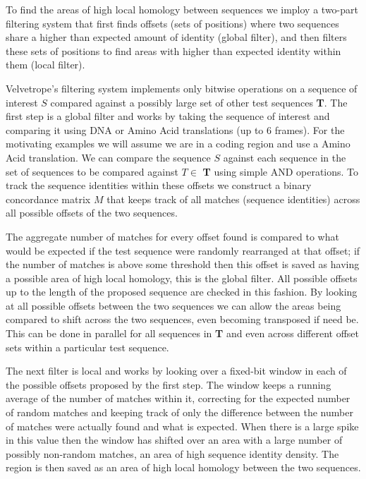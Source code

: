 \documentclass[phd,tocprelim]{cornell}
\begin{document}
To find the areas of high local homology between sequences we imploy a two-part filtering system that first finds offsets (sets of positions) where two sequences share a higher than expected amount of identity (global filter), and then filters these sets of positions to find areas with higher than expected identity within them (local filter).

Velvetrope's filtering system implements only bitwise operations on a sequence of interest $S$ compared against a possibly large set of other test sequences \textbf{T}. The first step is a global filter and works by taking the sequence of interest and comparing it using DNA or Amino Acid translations (up to 6 frames). For the motivating examples we will assume we are in a coding region and use a Amino Acid translation. We can compare the sequence $S$ against each sequence in the set of sequences to be compared against $T \in$ \textbf{T}  using simple AND operations. To track the sequence identities within these offsets we construct a binary concordance matrix $M$ that keeps track of all matches (sequence identities) across all possible offsets of the two sequences.

The aggregate number of matches for every offset found is compared to what would be expected if the test sequence were randomly rearranged at that offset; if the number of matches is above some threshold then this offset is saved as having a possible area of high local homology, this is the global filter. All possible offsets up to the length of the proposed sequence are checked in this fashion. By looking at all possible offsets between the two sequences we can allow the areas being compared to shift across the two sequences, even becoming transposed if need be. This can be done in parallel for all sequences in \textbf{T} and even across different offset sets within a particular test sequence.

The next filter is local and works by looking over a fixed-bit window in each of the possible offsets proposed by the first step. The window keeps a running average of the number of matches within it, correcting for the expected number of random matches and keeping track of only the difference between the number of matches were actually found and what is expected. When there is a large spike in this value then the window has shifted over an area with a large number of possibly non-random matches, an area of high sequence identity density. The region is then saved as an area of high local homology between the two sequences.
\end{document}
